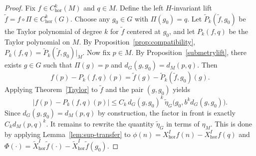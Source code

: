 \documentclass[12pt]{amsart}
\begin{document}
\begin{proof}
Fix $f\in C^k_{\mathrm{hor}}(M)$ and $q\in M$.  Define the left $H$-invariant lift
\(
\tilde f = f\circ \Pi \in C^k_{\mathrm{hor}}(G).
\)
Choose any $g_0\in G$ with $\Pi(g_0)=q$.
Let $\tilde P_k(\tilde f,g_0)$ be the  Taylor polynomial of degree $k$ for $\tilde f$
centered at $g_0$, and let $P_k(f,q)$ be the Taylor polynomial on $M$.
By Proposition~\ref{prop:compatibility}, \(
P_k(f,q) = \tilde P_k(\tilde f,g_0)\big|_{M}.
\)
Now fix $p\in M$. 
By Proposition~\ref{submetrylift}, there exists
$g\in G$ such that
\(
\Pi(g)=p\) and \( d_G(g,g_0)=d_M(p,q).
\)
Then
\[
f(p)-P_k(f,q)(p)
=
\tilde f(g) - \tilde P_k(\tilde f,g_0)(g).
\]
Applying Theorem~\ref{Taylor} to $\tilde f$ and the pair $(g,g_0)$ yields
\begin{equation}\label{eq:TQ-step1}
\big| f(p)-P_k(f,q)(p)\big|
\leq
C_k\, d_G(g,g_0)^k\, \tilde \eta_G\big(g_0,b^k d_G(g,g_0)\big).
\end{equation}
Since $d_G(g,g_0)=d_M(p,q)$ by construction, the factor in front is exactly
$C_k d_M(p,q)^k$.  It remains to rewrite the quantity $\tilde \eta_G$ in terms of $\eta_M$. This is done by applying  Lemma~\ref{lem:sup-transfer} to $\phi(n) = X_{\mathrm{hor}}^I f(n)-X_{\mathrm{hor}}^I f(q)$ and $\Phi(\cdot) = \tilde X_{\mathrm{hor}}^I \tilde f(\cdot)-\tilde X_{\mathrm{hor}}^I \tilde f(g_0)$.


\end{proof}
\end{document}
